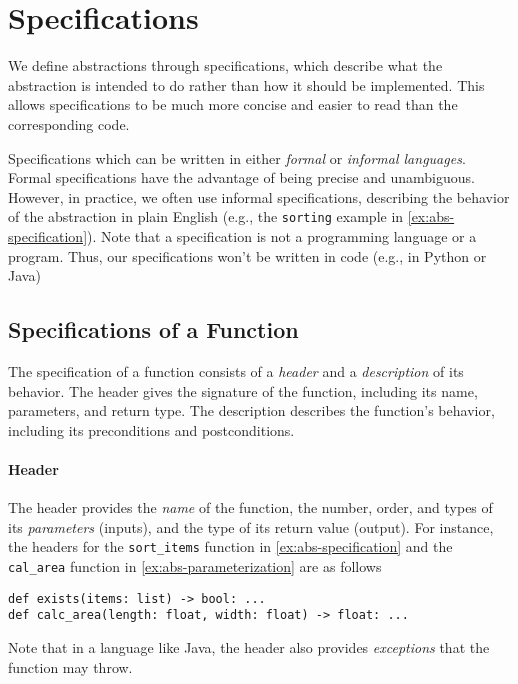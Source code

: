 \documentclass[oneside,11pt,dvipsnames]{book}
\newcommand{\code}[1]{\texttt{#1}}
\begin{document}
\section{Specifications}\label{sec:specifications}

We define abstractions through specifications, which describe what the abstraction is intended to do rather than how it should be implemented. This allows specifications to be much more concise and easier to read than the corresponding code.

Specifications which can be written in either \emph{formal} or \emph{informal languages}. Formal specifications have the advantage of being precise and unambiguous. However, in practice, we often use informal specifications, describing the behavior of the abstraction in plain English (e.g., the \code{sorting} example in \autoref{ex:abs-specification}).  Note that a specification is not a programming language or a program. Thus, our specifications won’t be written in code (e.g., in Python or Java)

\subsection{Specifications of a Function}

The specification of a function consists of a \emph{header} and a \emph{description} of its behavior.
The header gives the signature of the function, including its name, parameters, and return type. The description describes the function's behavior, including its preconditions and postconditions.

\paragraph{Header} The header provides the \emph{name} of the function, the number, order, and types of its \emph{parameters} (inputs), and the type of its return value (output). For instance, the headers for the \code{sort\_items} function in \autoref{ex:abs-specification} and the \code{cal\_area} function in \autoref{ex:abs-parameterization} are as follows

\begin{lstlisting}
def exists(items: list) -> bool: ...
def calc_area(length: float, width: float) -> float: ...
\end{lstlisting}

Note that in a language like Java, the header also provides \emph{exceptions} that the function may throw.
\end{document}
